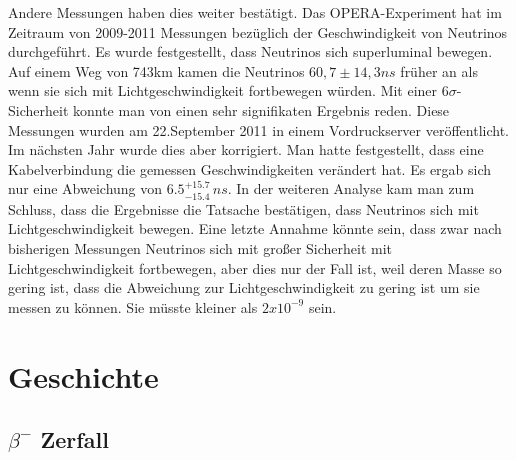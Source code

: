Andere Messungen haben dies weiter bestätigt. Das OPERA-Experiment hat im Zeitraum von 2009-2011 Messungen bezüglich der Geschwindigkeit von Neutrinos
durchgeführt. Es wurde festgestellt, dass Neutrinos sich superluminal bewegen. Auf einem Weg von 743km kamen die Neutrinos
$60,7 \pm 14,3 ns$ früher an als wenn sie sich mit Lichtgeschwindigkeit fortbewegen würden. Mit einer $6\sigma$-Sicherheit
konnte man von einen sehr signifikaten Ergebnis reden. Diese Messungen wurden am 22.September 2011 in
einem Vordruckserver veröffentlicht. \cite{OPERA2011} \\
Im nächsten Jahr wurde dies aber korrigiert. Man hatte festgestellt, dass eine Kabelverbindung die gemessen Geschwindigkeiten
verändert hat. Es ergab sich nur eine Abweichung von $6.5_{-15.4}^{+15.7}\, ns$. In der weiteren Analyse kam man
zum Schluss, dass die Ergebnisse die Tatsache bestätigen, dass Neutrinos sich mit Lichtgeschwindigkeit bewegen.
Eine letzte Annahme könnte sein, dass zwar nach bisherigen Messungen Neutrinos sich mit großer Sicherheit mit
Lichtgeschwindigkeit fortbewegen, aber dies nur der Fall ist, weil deren Masse so gering ist, dass die Abweichung
zur Lichtgeschwindigkeit zu gering ist um sie messen zu können. Sie müsste kleiner als $2x10^{-9}$ sein.

\section{Geschichte}

\subsection{$\beta^{-}$ Zerfall}

